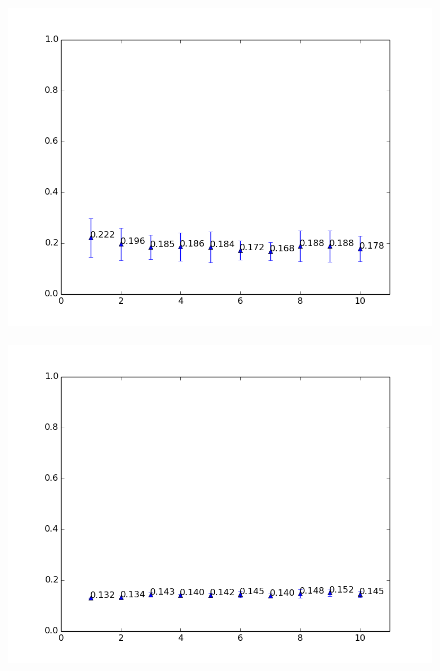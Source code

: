 \begin{figure}[h!]
	\centering
	\begin{minipage}{.49\linewidth}
		\includegraphics[width=\linewidth]{fig/PartyAllComparisonSpam-eps1.0,budg=eps,peers30,groups1-10,reg2e-2-pubParty-newAggregationStyleTEST.png}
		\label{fig:RegRangeTestPubParty}
	\end{minipage}
	\hspace{.001\linewidth}
	\begin{minipage}{.49\linewidth}
		\includegraphics[width=\linewidth]{fig/PartyAllComparisonSpam-eps1.0,budg=eps,peers30,groups1-10,reg2e-2-pubAll-newAggregationStyleTEST.png}
		\label{fig:RegRangeTestPubAll}
	\end{minipage}
\end{figure}


